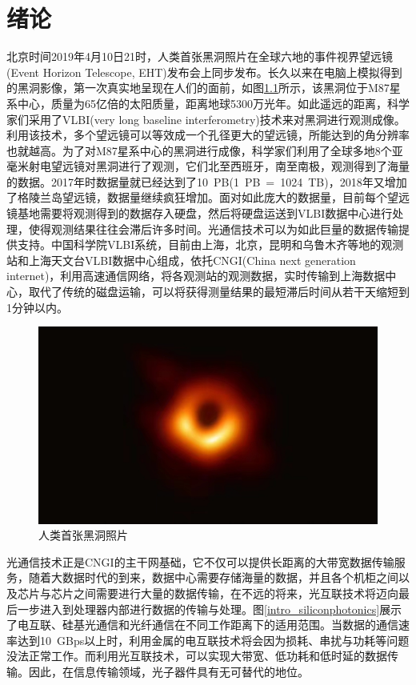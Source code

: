 \chapter{绪论}

北京时间2019年4月10日21时，人类首张黑洞照片在全球六地的事件视界望远镜(Event Horizon Telescope, EHT)发布会上同步发布。长久以来在电脑上模拟得到的黑洞影像，第一次真实地呈现在人们的面前，如图\ref{intro_black_hole}所示，该黑洞位于M87星系中心，质量为65亿倍的太阳质量，距离地球5300万光年。如此遥远的距离，科学家们采用了VLBI(very long baseline interferometry)技术来对黑洞进行观测成像。利用该技术，多个望远镜可以等效成一个孔径更大的望远镜，所能达到的角分辨率也就越高。为了对M87星系中心的黑洞进行成像，科学家们利用了全球多地8个亚毫米射电望远镜对黑洞进行了观测，它们北至西班牙，南至南极，观测得到了海量的数据。2017年时数据量就已经达到了10~PB(1~PB~=~1024~TB)，2018年又增加了格陵兰岛望远镜，数据量继续疯狂增加。面对如此庞大的数据量，目前每个望远镜基地需要将观测得到的数据存入硬盘，然后将硬盘运送到VLBI数据中心进行处理，使得观测结果往往会滞后许多时间。光通信技术可以为如此巨量的数据传输提供支持。中国科学院VLBI系统，目前由上海，北京，昆明和乌鲁木齐等地的观测站和上海天文台VLBI数据中心组成，依托CNGI(China next generation internet)，利用高速通信网络，将各观测站的观测数据，实时传输到上海数据中心，取代了传统的磁盘运输，可以将获得测量结果的最短滞后时间从若干天缩短到1分钟以内。

\begin{figure}[htb]
	\centering
	\includegraphics[width=13cm]{./Pictures/intro_black_hole.jpg}
	\captionsetup{justification=centering}
	\caption{人类首张黑洞照片}
	\label{intro_black_hole}
\end{figure}

光通信技术正是CNGI的主干网基础，它不仅可以提供长距离的大带宽数据传输服务，随着大数据时代的到来，数据中心需要存储海量的数据，并且各个机柜之间以及芯片与芯片之间需要进行大量的数据传输，在不远的将来，光互联技术将迈向最后一步进入到处理器内部进行数据的传输与处理。图\ref{intro_siliconphotonics}展示了电互联、硅基光通信和光纤通信在不同工作距离下的适用范围。当数据的通信速率达到10~GBps以上时，利用金属的电互联技术将会因为损耗、串扰与功耗等问题没法正常工作。而利用光互联技术，可以实现大带宽、低功耗和低时延的数据传输。因此，在信息传输领域，光子器件具有无可替代的地位。

